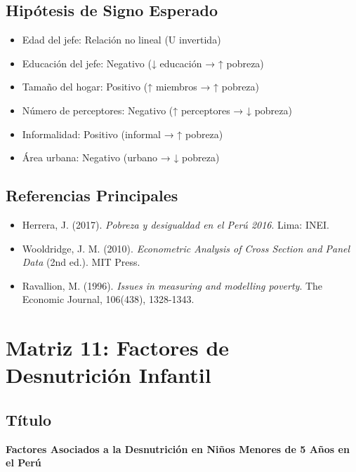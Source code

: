 \documentclass[
  man,
  floatsintext,
  longtable,
  a4paper,
  nolmodern,
  notxfonts,
  notimes,
  12pt,
  colorlinks=true,linkcolor=blue,citecolor=blue,urlcolor=blue]{apa7}
\providecommand{\tightlist}{%
  \setlength{\itemsep}{0pt}\setlength{\parskip}{0pt}}
\begin{document}
\subsection{Hipótesis de Signo
Esperado}\label{hipuxf3tesis-de-signo-esperado}

\begin{itemize}
\tightlist
\item
  Edad del jefe: Relación no lineal (U invertida)
\item
  Educación del jefe: Negativo (↓ educación → ↑ pobreza)
\item
  Tamaño del hogar: Positivo (↑ miembros → ↑ pobreza)
\item
  Número de perceptores: Negativo (↑ perceptores → ↓ pobreza)
\item
  Informalidad: Positivo (informal → ↑ pobreza)
\item
  Área urbana: Negativo (urbano → ↓ pobreza)
\end{itemize}

\subsection{Referencias Principales}\label{referencias-principales-9}

\begin{itemize}
\tightlist
\item
  Herrera, J. (2017). \emph{Pobreza y desigualdad en el Perú 2016}.
  Lima: INEI.
\item
  Wooldridge, J. M. (2010). \emph{Econometric Analysis of Cross Section
  and Panel Data} (2nd ed.). MIT Press.
\item
  Ravallion, M. (1996). \emph{Issues in measuring and modelling
  poverty}. The Economic Journal, 106(438), 1328-1343.
\end{itemize}

\section{Matriz 11: Factores de Desnutrición
Infantil}\label{matriz-11-factores-de-desnutriciuxf3n-infantil}

\subsection{Título}\label{tuxedtulo-10}

\textbf{Factores Asociados a la Desnutrición en Niños Menores de 5 Años
en el Perú}
\end{document}
